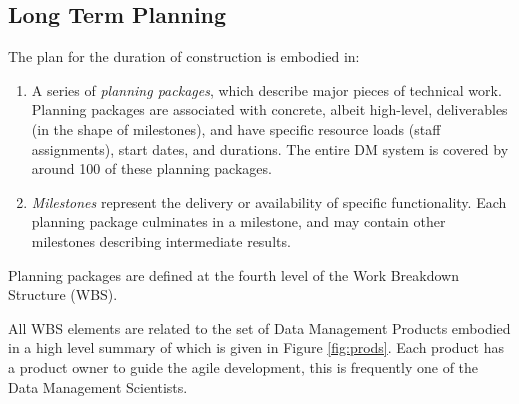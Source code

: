 \subsection{Long Term Planning}
\label{sec:long-term-plan}

The plan for the duration of construction is embodied in:

\begin{enumerate}
\item
  A series of \emph{planning packages}, which describe major pieces of
  technical work. Planning packages are associated with concrete, albeit
  high-level, deliverables (in the shape of milestones), and have
  specific resource loads (staff assignments), start dates, and
  durations. The entire DM system is covered by around 100 of these
  planning packages.
\item
  \emph{Milestones} represent the delivery or availability of specific
  functionality. Each planning package culminates in a milestone, and
  may contain other milestones describing intermediate results.
\end{enumerate}

Planning packages are defined at the fourth level of the Work Breakdown Structure (WBS).

All WBS elements are related to the set of Data Management Products embodied in \cite{LDM-148} a high level summary of which is given in
Figure \ref{fig:prods}. Each product has a product owner to guide the agile development, this is frequently one of the Data Management Scientists.

